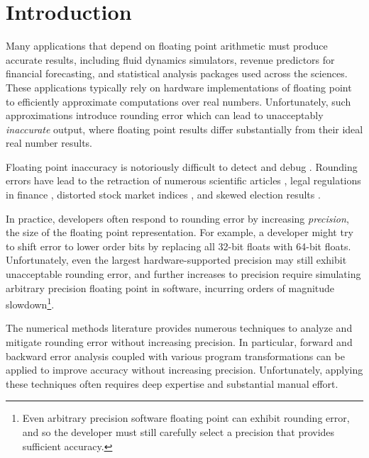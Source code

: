 \documentclass[paper.tex]{subfiles}
\begin{document}
\section{Introduction}
\label{sec:introduction}

Many applications that depend on floating point arithmetic must
produce accurate results, including fluid dynamics simulators, revenue
predictors for financial forecasting, and statistical analysis
packages used across the sciences.  These applications typically rely
on hardware implementations of floating point to efficiently
approximate computations over real numbers.  Unfortunately, such
approximations introduce rounding error which can lead to unacceptably
\textit{inaccurate} output, where floating point results differ
substantially from their ideal real number results.


Floating point inaccuracy is notoriously difficult to detect and debug
.  Rounding errors have lead to the retraction of
numerous scientific articles , legal regulations in finance
, distorted stock market indices , and skewed
election results .

In practice, developers often respond to rounding error by increasing
\textit{precision}, the size of the floating point representation.
For example, a developer might try to shift error to lower order bits
by replacing all 32-bit floats with 64-bit floats.  Unfortunately,
even the largest hardware-supported precision may still exhibit
unacceptable rounding error, and further increases to precision
require simulating arbitrary precision floating point in software,
incurring orders of magnitude slowdown\footnote{Even arbitrary
  precision software floating point can exhibit rounding error, and so
  the developer must still carefully select a precision that provides
  sufficient accuracy.}.

 The numerical methods literature provides numerous
techniques to analyze and mitigate rounding error without increasing
precision.  In
particular, forward and backward error analysis  coupled
with various program transformations  can be applied to
improve accuracy without increasing precision.  Unfortunately,
applying these techniques often requires deep expertise and
substantial manual effort.
\end{document}
